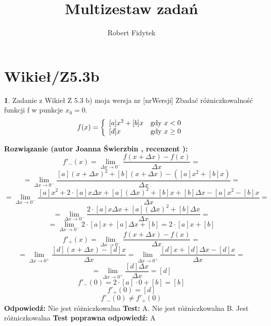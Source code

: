 \documentclass[12pt, a4paper]{article}
\title{Multizestaw zadań}
\author{Robert Fidytek}
\date{}
\theoremstyle{definition} %
\newtheorem{zad}{}
\newcommand{\kategoria}[1]{\section{#1}} %
\newcommand{\zadStart}[1]{\begin{zad}#1\newline} %
\newcommand{\zadStop}{\end{zad}}   %
\newcommand{\rozwStart}[2]{\noindent \textbf{Rozwiązanie (autor #1 , recenzent #2): }\newline} %
\newcommand{\rozwStop}{\newline}                                            %
\newcommand{\odpStart}{\noindent \textbf{Odpowiedź:}\newline}    %
\newcommand{\odpStop}{\newline}                                             %
\newcommand{\testStart}{\noindent \textbf{Test:}\newline} %
\newcommand{\testStop}{\newline} %
\newcommand{\kluczStart}{\noindent \textbf{Test poprawna odpowiedź:}\newline} %
\newcommand{\kluczStop}{\newline} %
\begin{document}
\maketitle


\kategoria{Wikieł/Z5.3b}
\zadStart{Zadanie z Wikieł Z 5.3 b) moja wersja nr [nrWersji]}
Zbadać różniczkowalność funkcji f w punkcje $x_0=0$.
$$
f(x) = \left\{ \begin{array}{ll}
[a]x^2+[b]x & \textrm{gdy $x<0$}\\
{[d]}x & \textrm{gdy $ x\geq 0$}
\end{array} \right.
$$
\zadStop
\rozwStart{Joanna Świerzbin}{}
$$f'_{-}(x)=\lim_{\Delta x \rightarrow 0^{-}} \frac{f(x+\Delta x)-f(x)}{\Delta x} = $$ 
$$= \lim_{\Delta x \rightarrow 0^{-}} \frac{[a](x+\Delta x)^2+[b](x+\Delta x) -([a]x^2+[b]x)}{\Delta x}= $$ $$ =
 \lim_{\Delta x \rightarrow 0^{-}}  \frac{[a]x^2+2 \cdot [a] x \Delta x+ [a] (\Delta x)^2+[b]x+[b]\Delta x -[a]x^2-[b]x}{\Delta x} =$$
 $$ = \lim_{\Delta x \rightarrow 0^{-}}  \frac{2 \cdot [a] x \Delta x+ [a] (\Delta x)^2+[b]\Delta x }{\Delta x} =$$
 $$ = \lim_{\Delta x \rightarrow 0^{-}}  {2 \cdot [a] x + [a] \Delta x+[b]} = 2\cdot[a]x+[b]$$
$$f'_{+}(x)=\lim_{\Delta x \rightarrow 0^{-}} \frac{f(x+\Delta x)-f(x)}{\Delta x} = $$ 
$$= \lim_{\Delta x \rightarrow 0^{+}} \frac{[d](x+\Delta x)-[d]x}{\Delta x} =
 \lim_{\Delta x \rightarrow 0^{+}}  \frac{[d]x+[d]\Delta x-[d]x}{\Delta x} =$$
 $$ = \lim_{\Delta x \rightarrow 0^{+}}  \frac{[d]\Delta x}{\Delta x} = [d] $$
$$f'_{-}(0) = 2\cdot[a]\cdot 0+[b] = [b]$$
$$f'_{+}(0) = [d]$$
$$ f'_{-}(0) \neq f'_{+}(0) $$
\rozwStop
\odpStart
Nie jest różniczkowalna
\odpStop
\testStart
A. Nie jest różniczkowalna
B. Jest różniczkowalna
\testStop
\kluczStart
A
\kluczStop
\end{document}
